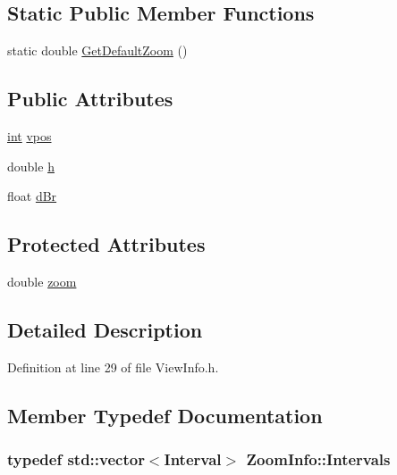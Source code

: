 \subsection*{Static Public Member Functions}
\begin{DoxyCompactItemize}
\item 
static double \hyperlink{class_zoom_info_a4508413dd55cf328c8e772dc8d0964a1}{Get\+Default\+Zoom} ()
\end{DoxyCompactItemize}
\subsection*{Public Attributes}
\begin{DoxyCompactItemize}
\item 
\hyperlink{xmltok_8h_a5a0d4a5641ce434f1d23533f2b2e6653}{int} \hyperlink{class_zoom_info_ae96b54cadf85fe96e933a6af9edbd660}{vpos}
\item 
double \hyperlink{class_zoom_info_a990819d4177a5eec904f6f7d65dac32a}{h}
\item 
float \hyperlink{class_zoom_info_a0437d7c445b980d89c8055be40577997}{d\+Br}
\end{DoxyCompactItemize}
\subsection*{Protected Attributes}
\begin{DoxyCompactItemize}
\item 
double \hyperlink{class_zoom_info_a6a9981680af013ef05118dbd4c5173ce}{zoom}
\end{DoxyCompactItemize}


\subsection{Detailed Description}


Definition at line 29 of file View\+Info.\+h.



\subsection{Member Typedef Documentation}
\subsubsection[{\texorpdfstring{Intervals}{Intervals}}]{\setlength{\rightskip}{0pt plus 5cm}typedef std\+::vector$<${\bf Interval}$>$ {\bf Zoom\+Info\+::\+Intervals}}\hypertarget{class_zoom_info_a68d0856b5e64abd74f91ebeedac395d3}{}\label{class_zoom_info_a68d0856b5e64abd74f91ebeedac395d3}


